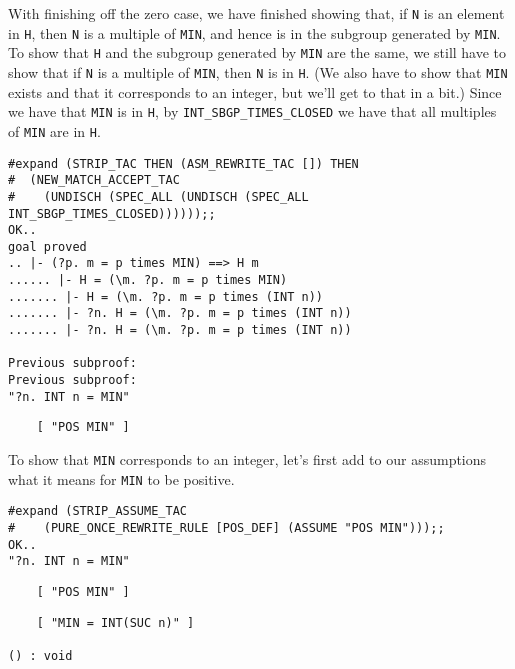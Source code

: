 With finishing off the zero case, we have finished showing that, if
{\small\tt N} is an element in {\small\tt H}, then {\small\tt N} is a
multiple of {\small\verb+MIN+}, and hence is in the subgroup generated
by {\small\verb+MIN+}.  To show that {\small\tt H} and the subgroup
generated by {\small\verb+MIN+} are the same, we still have to show
that if {\small\tt N} is a multiple of {\small\verb+MIN+}, then
{\small\tt N} is in {\small\tt H}.  (We also have to show that
{\small\verb+MIN+} exists and that it corresponds to an integer, but
we'll get to that in a bit.)  Since we have that {\small\verb+MIN+} is
in {\small\tt H}, by {\small\verb+INT_SBGP_TIMES_CLOSED+} we have that
all multiples of {\small\verb+MIN+} are in {\small\tt H}. 
\begin{session}
\begin{verbatim}
#expand (STRIP_TAC THEN (ASM_REWRITE_TAC []) THEN
#  (NEW_MATCH_ACCEPT_TAC
#    (UNDISCH (SPEC_ALL (UNDISCH (SPEC_ALL INT_SBGP_TIMES_CLOSED))))));;
OK..
goal proved
.. |- (?p. m = p times MIN) ==> H m
...... |- H = (\m. ?p. m = p times MIN)
....... |- H = (\m. ?p. m = p times (INT n))
....... |- ?n. H = (\m. ?p. m = p times (INT n))
....... |- ?n. H = (\m. ?p. m = p times (INT n))

Previous subproof:
Previous subproof:
"?n. INT n = MIN"
\end{verbatim}
\mvdots
\begin{verbatim}
    [ "POS MIN" ]
\end{verbatim}
\evdots
\end{session}

To show that {\small\verb+MIN+} corresponds to an integer, let's first
add to our assumptions what it means for {\small\verb+MIN+} to be
positive.
\begin{session}
\begin{verbatim}
#expand (STRIP_ASSUME_TAC
#    (PURE_ONCE_REWRITE_RULE [POS_DEF] (ASSUME "POS MIN")));;
OK..
"?n. INT n = MIN"
\end{verbatim}
\mvdots
\begin{verbatim}
    [ "POS MIN" ]
\end{verbatim}
\mvdots
\begin{verbatim}
    [ "MIN = INT(SUC n)" ]

() : void
\end{verbatim}
\end{session}

